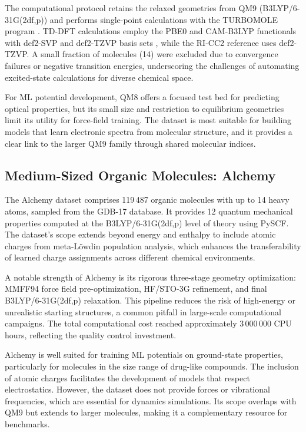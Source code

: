 \documentclass[12pt]{article}
\begin{document}
The computational protocol retains the relaxed geometries from QM9 (B3LYP/6-31G(2df,p)) and performs single-point calculations with the TURBOMOLE program \cite{ds9-89}. TD-DFT calculations employ the PBE0 and CAM-B3LYP functionals with def2-SVP and def2-TZVP basis sets \cite{ds9-90,ds9-91,ds9-92}, while the RI-CC2 reference \cite{ds9-93} uses def2-TZVP. A small fraction of molecules (14) were excluded due to convergence failures or negative transition energies, underscoring the challenges of automating excited-state calculations for diverse chemical space.

For ML potential development, QM8 offers a focused test bed for predicting optical properties, but its small size and restriction to equilibrium geometries limit its utility for force-field training. The dataset is most suitable for building models that learn electronic spectra from molecular structure, and it provides a clear link to the larger QM9 family through shared molecular indices.

\subsection{Medium-Sized Organic Molecules: Alchemy}

The Alchemy dataset \cite{ds10-6} comprises 119\,487 organic molecules with up to 14 heavy atoms, sampled from the GDB-17 database. It provides 12 quantum mechanical properties computed at the B3LYP/6-31G(2df,p) level of theory using PySCF. The dataset’s scope extends beyond energy and enthalpy to include atomic charges from meta-Löwdin population analysis, which enhances the transferability of learned charge assignments across different chemical environments.

A notable strength of Alchemy is its rigorous three-stage geometry optimization: MMFF94 force field pre-optimization, HF/STO-3G refinement, and final B3LYP/6-31G(2df,p) relaxation. This pipeline reduces the risk of high-energy or unrealistic starting structures, a common pitfall in large-scale computational campaigns. The total computational cost reached approximately 3\,000\,000 CPU hours, reflecting the quality control investment.

Alchemy is well suited for training ML potentials on ground-state properties, particularly for molecules in the size range of drug-like compounds. The inclusion of atomic charges facilitates the development of models that respect electrostatics. However, the dataset does not provide forces or vibrational frequencies, which are essential for dynamics simulations. Its scope overlaps with QM9 but extends to larger molecules, making it a complementary resource for benchmarks.
\end{document}
